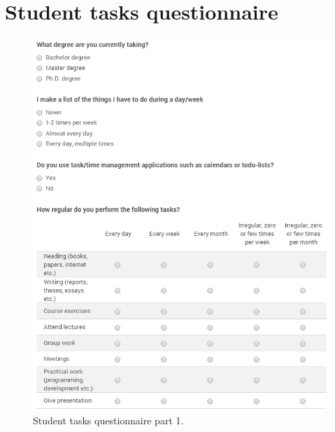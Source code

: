 \chapter{Student tasks questionnaire}

\begin{figure}[h]
\centering
\includegraphics[width=0.8\columnwidth]{appendix/StudentTasks1.PNG}
\caption{Student tasks questionnaire part 1.}
\end{figure}

